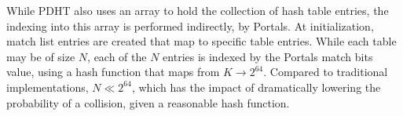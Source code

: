 While PDHT also uses an array to hold the collection of hash table entries, the
indexing into this array is performed indirectly, by Portals. At
initialization, match list entries are created that map to specific table
entries. While each table may be of size $N$, each of the $N$ entries is
indexed by the Portals match bits value, using a hash function that maps from
$K \rightarrow 2^{64}$. Compared to traditional implementations, $N \ll
2^{64}$, which has the impact of dramatically lowering the probability of a
collision, given a reasonable hash function.







